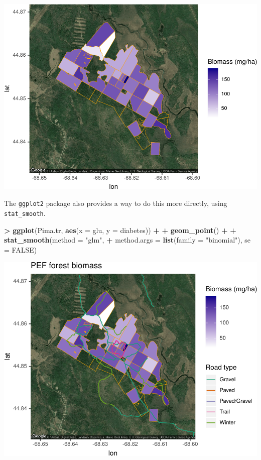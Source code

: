 \documentclass[]{krantz}
\makeatletter
\newenvironment{Shaded}{\begin{snugshade}}{\end{snugshade}}
\newcommand{\DataTypeTok}[1]{\textcolor[rgb]{0.27,0.27,0.27}{#1}}
\newcommand{\KeywordTok}[1]{\textcolor[rgb]{0.27,0.27,0.27}{\textbf{#1}}}
\newcommand{\NormalTok}[1]{#1}
\newcommand{\OperatorTok}[1]{\textcolor[rgb]{0.43,0.43,0.43}{\textbf{#1}}}
\newcommand{\OtherTok}[1]{\textcolor[rgb]{0.37,0.37,0.37}{#1}}
\newcommand{\StringTok}[1]{\textcolor[rgb]{0.5,0.5,0.5}{#1}}
\newenvironment{kframe}{%
\medskip{}
\setlength{\fboxsep}{.8em}
 \def\at@end@of@kframe{}%
 \ifinner\ifhmode%
  \def\at@end@of@kframe{\end{minipage}}%
  \begin{minipage}{\columnwidth}%
 \fi\fi%
 \def\FrameCommand##1{\hskip\@totalleftmargin \hskip-\fboxsep
 \colorbox{shadecolor}{##1}\hskip-\fboxsep
     \hskip-\linewidth \hskip-\@totalleftmargin \hskip\columnwidth}%
 \MakeFramed {\advance\hsize-\width
   \@totalleftmargin\z@ \linewidth\hsize
   \@setminipage}}%
 {\par\unskip\endMakeFramed%
 \at@end@of@kframe}
\renewenvironment{Shaded}{\begin{kframe}}{\end{kframe}}
\makeatother
\begin{document}
\includegraphics{bookdown_files/figure-latex/unnamed-chunk-223-1.pdf}

The \texttt{ggplot2} package also provides a way to do this more directly, using \texttt{stat\_smooth}.

\begin{Shaded}
\begin{Highlighting}[]
\OperatorTok{>}\StringTok{ }\KeywordTok{ggplot}\NormalTok{(Pima.tr, }\KeywordTok{aes}\NormalTok{(}\DataTypeTok{x =}\NormalTok{ glu, }\DataTypeTok{y =}\NormalTok{ diabetes)) }\OperatorTok{+}\StringTok{ }
\OperatorTok{+}\StringTok{   }\KeywordTok{geom_point}\NormalTok{() }\OperatorTok{+}\StringTok{ }
\OperatorTok{+}\StringTok{   }\KeywordTok{stat_smooth}\NormalTok{(}\DataTypeTok{method =} \StringTok{"glm"}\NormalTok{, }
\OperatorTok{+}\StringTok{               }\DataTypeTok{method.args =} \KeywordTok{list}\NormalTok{(}\DataTypeTok{family =} \StringTok{"binomial"}\NormalTok{), }\DataTypeTok{se =} \OtherTok{FALSE}\NormalTok{)}
\end{Highlighting}
\end{Shaded}

\includegraphics{bookdown_files/figure-latex/unnamed-chunk-224-1.pdf}
\end{document}
